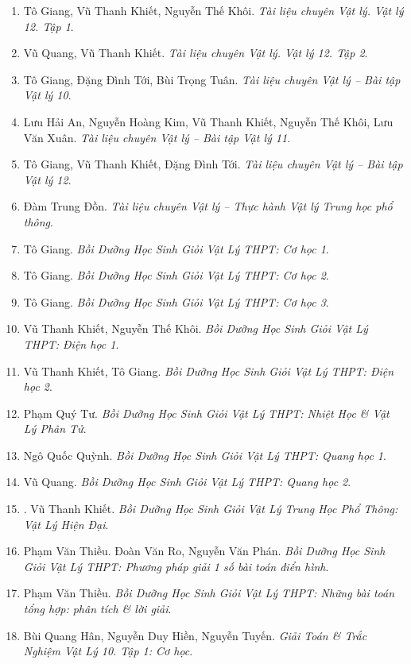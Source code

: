 \documentclass{article}
\begin{document}
\begin{enumerate}	
	\item Tô Giang, Vũ Thanh Khiết, Nguyễn Thế Khôi. {\it Tài liệu chuyên Vật lý. Vật lý 12. Tập 1}.
	\item Vũ Quang, Vũ Thanh Khiết. {\it Tài liệu chuyên Vật lý. Vật lý 12. Tập 2}.
	\item Tô Giang, Đặng Đình Tới, Bùi Trọng Tuân. {\it Tài liệu chuyên Vật lý -- Bài tập Vật lý 10}.
	\item Lưu Hải An, Nguyễn Hoàng Kim, Vũ Thanh Khiết, Nguyễn Thế Khôi, Lưu Văn Xuân. {\it Tài liệu chuyên Vật lý -- Bài tập Vật lý 11}.
	\item Tô Giang, Vũ Thanh Khiết, Đặng Đình Tới. {\it Tài liệu chuyên Vật lý -- Bài tập Vật lý 12}.
	\item Đàm Trung Đồn. {\it Tài liệu chuyên Vật lý -- Thực hành Vật lý Trung học phổ thông}.
	\item Tô Giang. {\it Bồi Dưỡng Học Sinh Giỏi Vật Lý THPT: Cơ học 1}.\hfill{\sf[reading]}
	\item Tô Giang. {\it Bồi Dưỡng Học Sinh Giỏi Vật Lý THPT: Cơ học 2}.\hfill{\sf[reading]}
	\item Tô Giang. {\it Bồi Dưỡng Học Sinh Giỏi Vật Lý THPT: Cơ học 3}.\hfill{\sf[reading]}
	\item Vũ Thanh Khiết, Nguyễn Thế Khôi. {\it Bồi Dưỡng Học Sinh Giỏi Vật Lý THPT: Điện học 1}.\hfill{\sf[reading]}
	\item Vũ Thanh Khiết, Tô Giang. {\it Bồi Dưỡng Học Sinh Giỏi Vật Lý THPT: Điện học 2}.\hfill{\sf[reading]}
	\item Phạm Quý Tư. {\it Bồi Dưỡng Học Sinh Giỏi Vật Lý THPT: Nhiệt Học \& Vật Lý Phân Tử}.
	\item Ngô Quốc Quỳnh. {\it Bồi Dưỡng Học Sinh Giỏi Vật Lý THPT: Quang học 1}.\hfill{\sf[reading]}
	\item Vũ Quang. {\it Bồi Dưỡng Học Sinh Giỏi Vật Lý THPT: Quang học 2}.
	\item \cite{Khiet_Vat_Ly_hien_dai}. Vũ Thanh Khiết. {\it Bồi Dưỡng Học Sinh Giỏi Vật Lý Trung Học Phổ Thông: Vật Lý Hiện Đại}.\hfill{\sf[reading]}
	\item Phạm Văn Thiều. Đoàn Văn Ro, Nguyễn Văn Phán. {\it Bồi Dưỡng Học Sinh Giỏi Vật Lý THPT: Phương pháp giải 1 số bài toán điển hình}.
	\item Phạm Văn Thiều. {\it Bồi Dưỡng Học Sinh Giỏi Vật Lý THPT: Những bài toán tổng hợp: phân tích \& lời giải}.
	\item Bùi Quang Hân, Nguyễn Duy Hiền, Nguyễn Tuyến. {\it Giải Toán \& Trắc Nghiệm Vật Lý 10. Tập 1: Cơ học}.

\end{enumerate}
\end{document}
